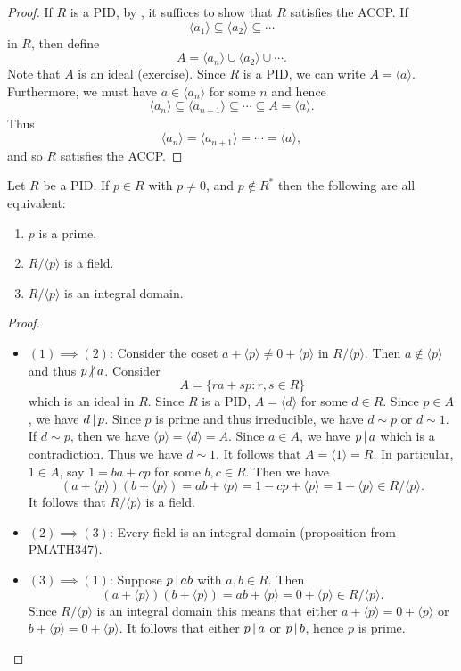 \documentclass[11pt]{article}
\begin{document}
\begin{proof}
    If $R$ is a PID, by , it suffices to show that $R$ satisfies the ACCP. If
    \[\langle a_1\rangle\subseteq\langle a_2\rangle\subseteq\cdots\]
    in $R$, then define
    \[A=\langle a_n\rangle\cup\langle a_2\rangle\cup\cdots.\]
    Note that $A$ is an ideal (exercise). Since $R$ is a PID, we can write $A=\langle a\rangle$. Furthermore, we must have $a\in\langle a_n\rangle$ for some $n$ and hence
    \[\langle a_n\rangle\subseteq\langle a_{n+1}\rangle\subseteq\cdots\subseteq A=\langle a\rangle.\]
    Thus
    \[\langle a_n\rangle=\langle a_{n+1}\rangle=\cdots=\langle a\rangle,\]
    and so $R$ satisfies the ACCP.
    
\end{proof}

\begin{theorem}
    Let $R$ be a PID. If $p\in R$ with $p\neq0$, and $p\not\in R^*$ then the following are all equivalent:
    \begin{enumerate}
        \item $p$ is a prime.
        \item $R/\langle p\rangle$ is a field.
        \item $R/\langle p\rangle$ is an integral domain.
    \end{enumerate}
\end{theorem}

\begin{proof}\,
    \begin{itemize}
        \item$(1)\implies(2)$: Consider the coset $a+\langle p\rangle\neq0+\langle p\rangle$ in $R/\langle p\rangle$. Then $a\not\in\langle p\rangle$ and thus $p\nd a$. Consider
        \[A=\{ra+sp:r,s\in R\}\]
        which is an ideal in $R$. Since $R$ is a PID, $A=\langle d\rangle$ for some $d\in R$. Since $p\in A$, we have $d\,|\, p$. Since $p$ is prime and thus irreducible, we have $d\sim p$ or $d\sim 1$. If $d\sim p$, then we have $\langle p\rangle=\langle d\rangle=A$. Since $a\in A$, we have $p\,|\, a$ which is a contradiction. Thus we have $d\sim 1$. It follows that $A=\langle 1\rangle=R$. In particular, $1\in A$, say $1=ba+cp$ for some $b,c\in R$. Then we have
        \[(a+\langle p\rangle)(b+\langle p\rangle)=ab+\langle p\rangle=1-cp+\langle p\rangle=1+\langle p\rangle\in R/\langle p\rangle.\]
        It follows that $R/\langle p\rangle$ is a field.

        \item$(2)\implies(3)$: Every field is an integral domain (proposition from PMATH347).

        \item$(3)\implies(1)$: Suppose $p\,|\, ab$ with $a,b\in R$. Then
        \[(a+\langle p\rangle)(b+\langle p\rangle)=ab+\langle p\rangle=0+\langle p\rangle\in R/\langle p\rangle.\]
        Since $R/\langle p\rangle$ is an integral domain this means that either $a+\langle p\rangle=0+\langle p\rangle$ or $b+\langle p\rangle=0+\langle p\rangle$. It follows that either $p\,|\, a$ or $p\,|\, b$, hence $p$ is prime.
    \end{itemize}
\end{proof}
\end{document}
